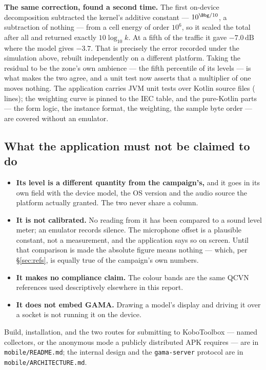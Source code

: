 \documentclass[11pt,a4paper]{article}
\newcommand{\dB}{\ensuremath{\,\mathrm{dB}}}
\begin{document}
\medskip\noindent
\textbf{The same correction, found a second time.} The first on-device
decomposition subtracted the kernel's additive constant --- $10^{\Bbg/10}$, a
subtraction of nothing --- from a cell energy of order $10^{6}$, so it scaled the
total after all and returned exactly $10\log_{10}k$. At a fifth of the traffic it
gave $-7.0\dB$ where the model gives $-3.7$. That is precisely the error recorded
under the simulation above, rebuilt independently on a different platform. Taking
the residual to be the zone's own ambience --- the fifth percentile of its levels
--- is what makes the two agree, and a unit test now asserts that a multiplier of
one moves nothing. The application carries \appTests{} JVM unit tests over
\appKtFiles{} Kotlin source files (\appKtLines{} lines); the weighting curve is
pinned to the IEC table, and the pure-Kotlin parts --- the form logic, the
instance format, the weighting, the sample byte order --- are covered without an
emulator.

\subsection{What the application must not be claimed to do}

\begin{itemize}
  \item \textbf{Its level is a different quantity from the campaign's,} and it
        goes in its own field with the device model, the OS version and the audio
        source the platform actually granted. The two never share a column.
  \item \textbf{It is not calibrated.} No reading from it has been compared to a
        sound level meter; an emulator records silence. The microphone offset is
        a plausible constant, not a measurement, and the application says so on
        screen. Until that comparison is made the absolute figure means nothing
        --- which, per \S\ref{sec:refs}, is equally true of the campaign's own
        numbers.
  \item \textbf{It makes no compliance claim.} The colour bands are the same
        QCVN references used descriptively elsewhere in this report.
  \item \textbf{It does not embed GAMA.} Drawing a model's display and driving it
        over a socket is not running it on the device.
\end{itemize}

\noindent
Build, installation, and the two routes for submitting to KoboToolbox --- named
collectors, or the anonymous mode a publicly distributed APK requires --- are in
\texttt{mobile/README.md}; the internal design and the \texttt{gama-server}
protocol are in \texttt{mobile/ARCHITECTURE.md}.
\end{document}
